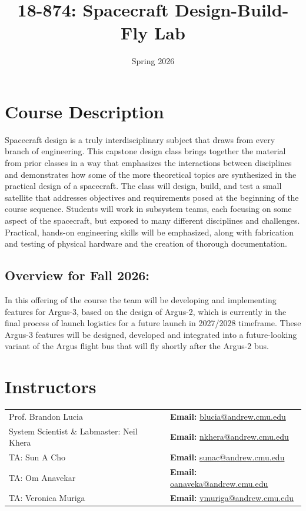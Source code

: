 \documentclass[11pt,letterpaper]{article}
\title{18-874: Spacecraft Design-Build-Fly Lab}
\author{Spring 2026}
\date{}
\begin{document}
\maketitle

\section*{Course Description}

Spacecraft design is a truly interdisciplinary subject that draws from every branch of engineering. This capstone design class brings together the material from prior classes in a way that emphasizes the interactions between disciplines and demonstrates how some of the more theoretical topics are synthesized in the practical design of a spacecraft. The class will design, build, and test a small satellite that addresses objectives and requirements posed at the beginning of the course sequence. Students will work in subsystem teams, each focusing on some aspect of the spacecraft, but exposed to many different disciplines and challenges. Practical, hands-on engineering skills will be emphasized, along with fabrication and testing of physical hardware and the creation of thorough documentation.

\subsection*{Overview for Fall 2026:} In this offering of the course the team
will be developing and implementing features for Argus-3, based on the design
of Argus-2, which is currently in the final process of launch logistics for a future launch in 2027/2028 timeframe.  
%
These Argus-3 features will be designed, developed and integrated into a future-looking variant of the Argus flight
bus that will fly shortly after the Argus-2 bus.

\section*{Instructors}

\begin{center}
\begin{tabular}{l l}
	Prof. Brandon Lucia & \textbf{Email:} \href{mailto:blucia@andrew.cmu.edu}{blucia@andrew.cmu.edu}
	\\
	System Scientist \& Labmaster: Neil Khera & \textbf{Email:} \href{nkhera@andrew.cmu.edu}{nkhera@andrew.cmu.edu} \\
	TA: Sun A Cho & \textbf{Email:} \href{sunac@andrew.cmu.edu}{sunac@andrew.cmu.edu} \\
	TA: Om Anavekar & \textbf{Email:} \href{oanaveka@andrew.cmu.edu}{oanaveka@andrew.cmu.edu} \\
	TA: Veronica Muriga & \textbf{Email:} \href{vmuriga@andrew.cmu.edu}{vmuriga@andrew.cmu.edu} 
\end{tabular}
\end{center}
\end{document}

